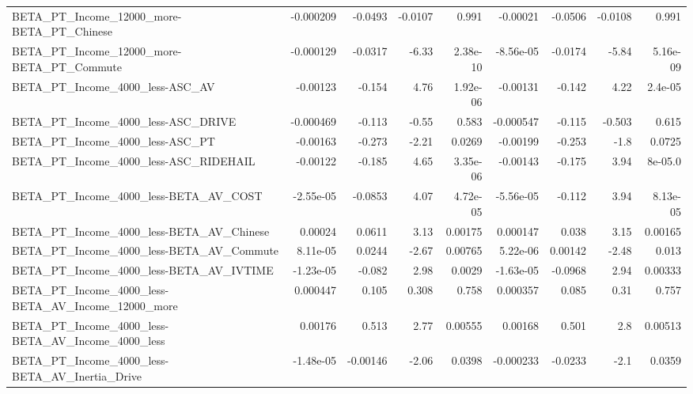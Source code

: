 \begin{tabular}{lrrrrrrrr}
BETA\_PT\_Income\_12000\_more-BETA\_PT\_Chinese          &   -0.000209 &      -0.0493 &  -0.0107 &    0.991 &   -0.00021 &     -0.0506 &      -0.0108 &         0.991 \\
BETA\_PT\_Income\_12000\_more-BETA\_PT\_Commute          &   -0.000129 &      -0.0317 &    -6.33 & 2.38e-10 &  -8.56e-05 &     -0.0174 &        -5.84 &      5.16e-09 \\
BETA\_PT\_Income\_4000\_less-ASC\_AV                    &    -0.00123 &       -0.154 &     4.76 & 1.92e-06 &   -0.00131 &      -0.142 &         4.22 &       2.4e-05 \\
BETA\_PT\_Income\_4000\_less-ASC\_DRIVE                 &   -0.000469 &       -0.113 &    -0.55 &    0.583 &  -0.000547 &      -0.115 &       -0.503 &         0.615 \\
BETA\_PT\_Income\_4000\_less-ASC\_PT                    &    -0.00163 &       -0.273 &    -2.21 &   0.0269 &   -0.00199 &      -0.253 &         -1.8 &        0.0725 \\
BETA\_PT\_Income\_4000\_less-ASC\_RIDEHAIL              &    -0.00122 &       -0.185 &     4.65 & 3.35e-06 &   -0.00143 &      -0.175 &         3.94 &       8e-05.0 \\
BETA\_PT\_Income\_4000\_less-BETA\_AV\_COST              &   -2.55e-05 &      -0.0853 &     4.07 & 4.72e-05 &  -5.56e-05 &      -0.112 &         3.94 &      8.13e-05 \\
BETA\_PT\_Income\_4000\_less-BETA\_AV\_Chinese           &     0.00024 &       0.0611 &     3.13 &  0.00175 &   0.000147 &       0.038 &         3.15 &       0.00165 \\
BETA\_PT\_Income\_4000\_less-BETA\_AV\_Commute           &    8.11e-05 &       0.0244 &    -2.67 &  0.00765 &   5.22e-06 &     0.00142 &        -2.48 &         0.013 \\
BETA\_PT\_Income\_4000\_less-BETA\_AV\_IVTIME            &   -1.23e-05 &       -0.082 &     2.98 &   0.0029 &  -1.63e-05 &     -0.0968 &         2.94 &       0.00333 \\
BETA\_PT\_Income\_4000\_less-BETA\_AV\_Income\_12000\_more &    0.000447 &        0.105 &    0.308 &    0.758 &   0.000357 &       0.085 &         0.31 &         0.757 \\
BETA\_PT\_Income\_4000\_less-BETA\_AV\_Income\_4000\_less  &     0.00176 &        0.513 &     2.77 &  0.00555 &    0.00168 &       0.501 &          2.8 &       0.00513 \\
BETA\_PT\_Income\_4000\_less-BETA\_AV\_Inertia\_Drive     &   -1.48e-05 &     -0.00146 &    -2.06 &   0.0398 &  -0.000233 &     -0.0233 &         -2.1 &        0.0359 \\

\end{tabular}
